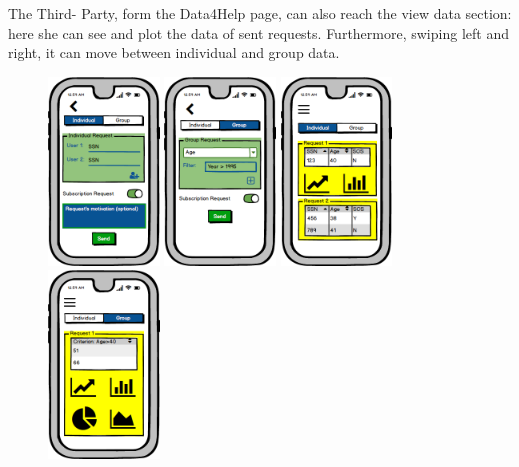 \documentclass[a4paper]{article}
\begin{document}
The Third- Party, form the Data4Help page, can also reach the view data section: here she can see and plot the data of sent requests. Furthermore, swiping left and right, it can move between individual and group data.
\begin{figure}[!htpb]		
     	\centering		
     	\includegraphics[height=50mm]{images/mockups/Requests.png}		
     	\includegraphics[height=50mm]{images/mockups/GroupRequest.png}		
     	\includegraphics[height=50mm]{images/mockups/ViewData.png}		
     	\includegraphics[height=50mm]{images/mockups/ViewData2.png}		
         \end{figure}
        
\end{document}
